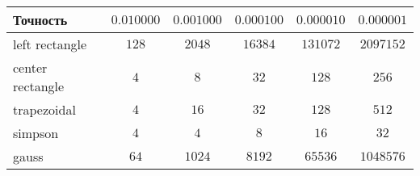 \begin{tabular}{|l|ccccc|}
\hline
Точность&$0.010000$&$0.001000$&$0.000100$&$0.000010$&$0.000001$\\
\hline
left rectangle&$128$&$2048$&$16384$&$131072$&$2097152$\\
center rectangle&$4$&$8$&$32$&$128$&$256$\\
trapezoidal&$4$&$16$&$32$&$128$&$512$\\
simpson&$4$&$4$&$8$&$16$&$32$\\
gauss&$64$&$1024$&$8192$&$65536$&$1048576$\\
\hline
\end{tabular}\\

